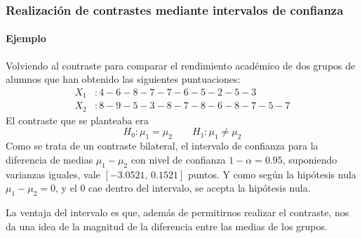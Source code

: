 \begin{frame}
\frametitle{Realización de contrastes mediante intervalos de confianza}
\framesubtitle{Ejemplo}
Volviendo al contraste para comparar el rendimiento académico de dos grupos de alumnos que han obtenido las siguientes puntuaciones:
\begin{align*}
X_1 &: 4 - 6 - 8 - 7 - 7 - 6 - 5 - 2 - 5 - 3 \\
X_2 &: 8 - 9 - 5 - 3 - 8 - 7 - 8 - 6 - 8 - 7 - 5 - 7
\end{align*}
El contraste que se planteaba era
\[
H_0: \mu_1=\mu_2\qquad H_1: \mu_1\neq \mu_2
\]
Como se trata de un contraste bilateral, el intervalo de confianza para la diferencia de medias $\mu_1-\mu_2$ con nivel de confianza $1-\alpha=0.95$, suponiendo varianzas iguales, vale $[-3.0521,\,0.1521]$ puntos. Y como según la hipótesis nula $\mu_1-\mu_2=0$, y el 0 cae dentro del intervalo, se acepta la hipótesis nula.

La ventaja del intervalo es que, además de permitirnos realizar el contraste, nos da una idea de la magnitud de la diferencia entre las medias de los grupos.
\end{frame}
